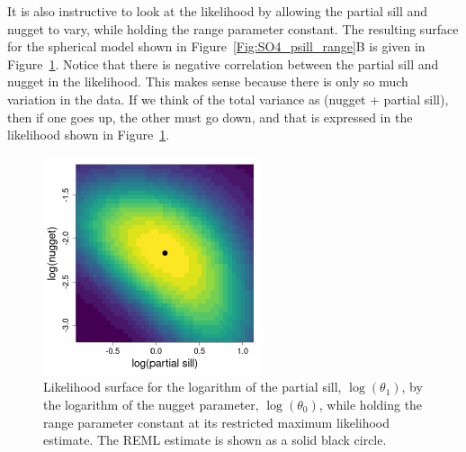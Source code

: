 \documentclass[12pt, titlepage]{article}
\begin{document}
It is also instructive to look at the likelihood by allowing the partial sill and nugget to vary, while holding the range parameter constant.  The resulting surface for the spherical model shown in Figure~\ref{Fig:SO4_psill_range}B is given in Figure~\ref{Fig:SO4_psill_nugget}. Notice that there is negative correlation between the partial sill and nugget in the likelihood.  This makes sense because there is only so much variation in the data. If we think of the total variance as (nugget + partial sill), then if one goes up, the other must go down, and that is expressed in the likelihood shown in Figure~\ref{Fig:SO4_psill_nugget}.
\begin{figure}[H]
  \begin{center}
	    \includegraphics[width=.5\linewidth]{SO4_psillvsnugget}
  \end{center}
  \caption{Likelihood surface for the logarithm of the partial sill, $\log(\theta_{1})$, by the logarithm of the nugget parameter, $\log(\theta_{0})$, while holding the range parameter constant at its restricted maximum likelihood estimate. The REML estimate is shown as a solid black circle. \label{Fig:SO4_psill_nugget}}
\end{figure}
\end{document}
